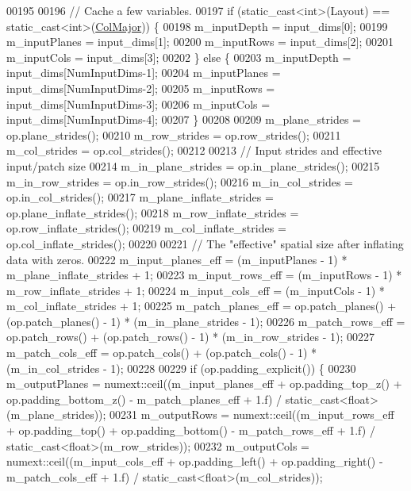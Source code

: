 \begin{DoxyCode}
00195 
00196     \textcolor{comment}{// Cache a few variables.}
00197     \textcolor{keywordflow}{if} (static\_cast<int>(Layout) == static\_cast<int>(\hyperlink{group__enums_ggaacded1a18ae58b0f554751f6cdf9eb13a0cbd4bdd0abcfc0224c5fcb5e4f6669a}{ColMajor})) \{
00198       m\_inputDepth = input\_dims[0];
00199       m\_inputPlanes = input\_dims[1];
00200       m\_inputRows = input\_dims[2];
00201       m\_inputCols = input\_dims[3];
00202     \} \textcolor{keywordflow}{else} \{
00203       m\_inputDepth = input\_dims[NumInputDims-1];
00204       m\_inputPlanes = input\_dims[NumInputDims-2];
00205       m\_inputRows = input\_dims[NumInputDims-3];
00206       m\_inputCols = input\_dims[NumInputDims-4];
00207     \}
00208 
00209     m\_plane\_strides = op.plane\_strides();
00210     m\_row\_strides = op.row\_strides();
00211     m\_col\_strides = op.col\_strides();
00212 
00213     \textcolor{comment}{// Input strides and effective input/patch size}
00214     m\_in\_plane\_strides = op.in\_plane\_strides();
00215     m\_in\_row\_strides = op.in\_row\_strides();
00216     m\_in\_col\_strides = op.in\_col\_strides();
00217     m\_plane\_inflate\_strides = op.plane\_inflate\_strides();
00218     m\_row\_inflate\_strides = op.row\_inflate\_strides();
00219     m\_col\_inflate\_strides = op.col\_inflate\_strides();
00220 
00221     \textcolor{comment}{// The "effective" spatial size after inflating data with zeros.}
00222     m\_input\_planes\_eff = (m\_inputPlanes - 1) * m\_plane\_inflate\_strides + 1;
00223     m\_input\_rows\_eff = (m\_inputRows - 1) * m\_row\_inflate\_strides + 1;
00224     m\_input\_cols\_eff = (m\_inputCols - 1) * m\_col\_inflate\_strides + 1;
00225     m\_patch\_planes\_eff = op.patch\_planes() + (op.patch\_planes() - 1) * (m\_in\_plane\_strides - 1);
00226     m\_patch\_rows\_eff = op.patch\_rows() + (op.patch\_rows() - 1) * (m\_in\_row\_strides - 1);
00227     m\_patch\_cols\_eff = op.patch\_cols() + (op.patch\_cols() - 1) * (m\_in\_col\_strides - 1);
00228 
00229     \textcolor{keywordflow}{if} (op.padding\_explicit()) \{
00230       m\_outputPlanes = numext::ceil((m\_input\_planes\_eff + op.padding\_top\_z() + op.padding\_bottom\_z() - 
      m\_patch\_planes\_eff + 1.f) / static\_cast<float>(m\_plane\_strides));
00231       m\_outputRows = numext::ceil((m\_input\_rows\_eff + op.padding\_top() + op.padding\_bottom() - 
      m\_patch\_rows\_eff + 1.f) / static\_cast<float>(m\_row\_strides));
00232       m\_outputCols = numext::ceil((m\_input\_cols\_eff + op.padding\_left() + op.padding\_right() - 
      m\_patch\_cols\_eff + 1.f) / static\_cast<float>(m\_col\_strides));

\end{DoxyCode}
